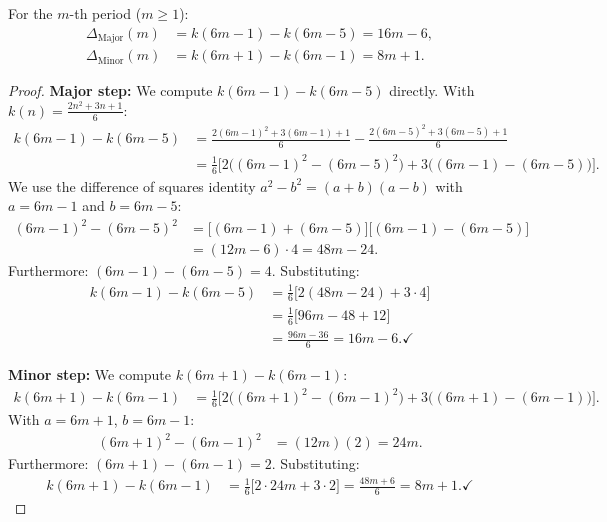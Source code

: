 \begin{satz}\label{satz:minor_major_formeln}
For the $m$-th period ($m \geq 1$):
\begin{align}
  \Delta_{\mathrm{Major}}(m)
  &= k(6m-1) - k(6m-5)
  = 16m - 6,\label{eq:major_formel}\\[6pt]
  \Delta_{\mathrm{Minor}}(m)
  &= k(6m+1) - k(6m-1)
  = 8m + 1.\label{eq:minor_formel}
\end{align}
\end{satz}

\begin{proof}
\textbf{Major step:} We compute $k(6m-1) - k(6m-5)$ directly.
With $k(n) = \frac{2n^2+3n+1}{6}$:
\begin{align*}
  k(6m-1) - k(6m-5)
  &= \frac{2(6m-1)^2 + 3(6m-1) + 1}{6}
   - \frac{2(6m-5)^2 + 3(6m-5) + 1}{6} \\[4pt]
  &= \frac{1}{6}\bigl[2\bigl((6m-1)^2 - (6m-5)^2\bigr)
     + 3\bigl((6m-1) - (6m-5)\bigr)\bigr].
\end{align*}
We use the difference of squares identity $a^2 - b^2 = (a+b)(a-b)$
with $a = 6m-1$ and $b = 6m-5$:
\begin{align*}
  (6m-1)^2 - (6m-5)^2
  &= \bigl[(6m-1)+(6m-5)\bigr]\bigl[(6m-1)-(6m-5)\bigr] \\
  &= (12m-6)\cdot 4
  = 48m - 24.
\end{align*}
Furthermore: $(6m-1)-(6m-5) = 4$. Substituting:
\begin{align*}
  k(6m-1) - k(6m-5)
  &= \frac{1}{6}\bigl[2(48m-24) + 3 \cdot 4\bigr] \\
  &= \frac{1}{6}\bigl[96m - 48 + 12\bigr] \\
  &= \frac{96m - 36}{6}
  = 16m - 6. \checkmark
\end{align*}

\textbf{Minor step:} We compute $k(6m+1) - k(6m-1)$:
\begin{align*}
  k(6m+1) - k(6m-1)
  &= \frac{1}{6}\bigl[2\bigl((6m+1)^2 - (6m-1)^2\bigr)
     + 3\bigl((6m+1) - (6m-1)\bigr)\bigr].
\end{align*}
With $a = 6m+1$, $b = 6m-1$:
\begin{align*}
  (6m+1)^2 - (6m-1)^2
  &= (12m)(2) = 24m.
\end{align*}
Furthermore: $(6m+1)-(6m-1) = 2$. Substituting:
\begin{align*}
  k(6m+1) - k(6m-1)
  &= \frac{1}{6}\bigl[2 \cdot 24m + 3 \cdot 2\bigr]
  = \frac{48m + 6}{6}
  = 8m + 1. \checkmark
\end{align*}
\end{proof}

